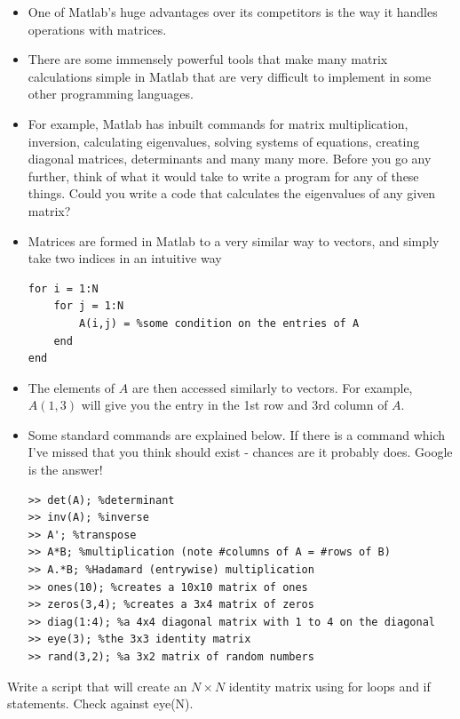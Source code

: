\documentclass[12pt]{report}
\begin{document}
\begin{itemize}
\item One of Matlab's huge advantages over its competitors is the way it handles operations with matrices. 
\item There are some immensely powerful tools that make many matrix calculations simple in Matlab that are very difficult to implement in some other programming languages. 
\item For example, Matlab has inbuilt commands for matrix multiplication, inversion, calculating eigenvalues, solving systems of equations, creating diagonal matrices, determinants and many many more. Before you go any further, think of what it would take to write a program for any of these things. Could you write a code that calculates the eigenvalues of any given matrix?
\item Matrices are formed in Matlab to a very similar way to vectors, and simply take two indices in an intuitive way
\begin{lstlisting}
for i = 1:N
	for j = 1:N
		A(i,j) = %some condition on the entries of A
	end
end
\end{lstlisting}
\item The elements of $A$ are then accessed similarly to vectors. For example, $A(1,3)$ will give you the entry in the 1st row and 3rd column of $A$.
\item Some standard commands are explained below. If there is a command which I've missed that you think should exist - chances are it probably does. Google is the answer!
\begin{lstlisting}
>> det(A); %determinant
>> inv(A); %inverse
>> A'; %transpose
>> A*B; %multiplication (note #columns of A = #rows of B)
>> A.*B; %Hadamard (entrywise) multiplication
>> ones(10); %creates a 10x10 matrix of ones
>> zeros(3,4); %creates a 3x4 matrix of zeros
>> diag(1:4); %a 4x4 diagonal matrix with 1 to 4 on the diagonal
>> eye(3); %the 3x3 identity matrix 
>> rand(3,2); %a 3x2 matrix of random numbers
\end{lstlisting}
\end{itemize}

\begin{tcolorbox}[title=Task - Quick]
	 Write a script that will create an $N \times N$ identity matrix using for loops and if statements. Check against eye(N).
\end{tcolorbox}
\end{document}

